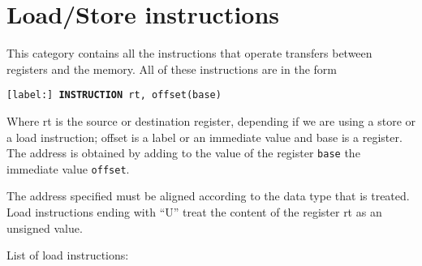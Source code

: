 \documentclass[12pt]{report}
\begin{document}
\section{Load/Store instructions}
This category contains all the instructions that operate transfers between
registers and the memory. All of these instructions are in the form

\begin{center}
	\texttt{[label:] \textbf{INSTRUCTION} rt, offset(base)}
\end{center}

Where rt is the source or destination register, depending if we are using a
store or a load instruction; offset is a label or an immediate value and base is
a register. The address is obtained by adding to the value of the register
\texttt{base} the immediate value \texttt{offset}.

The address specified must be aligned according to the data type that is
treated. Load instructions ending with ``U'' treat the content of the register
rt as an unsigned value.

List of load instructions:
\end{document}
